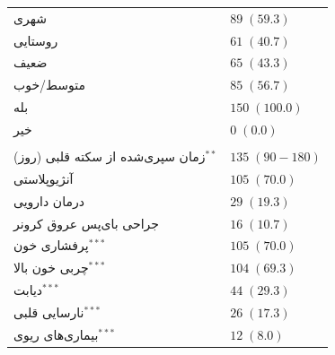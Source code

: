 {\begin{xltabular}{\textwidth}{@{} >{\raggedright\arraybackslash}X >{\centering\arraybackslash}X @{}}

        شهری   & $89 \; (59.3)$ \\

        روستایی & $61 \; (40.7)$ \\


        ضعیف        & $65 \; (43.3)$ \\

        متوسط/خوب   & $85 \; (56.7)$ \\


        بله & $150 \; (100.0)$ \\

        خیر & $0 \; (0.0)$ \\

        \midrule




         \\

        \midrule

        زمان سپری‌شده از سکته قلبی (روز)$^{**}$ & $135 \; (90 - 180)$ \\


        آنژیوپلاستی              & $105 \; (70.0)$ \\

        درمان دارویی             & $29 \; (19.3)$ \\

        جراحی بای‌پس عروق کرونر & $16 \; (10.7)$ \\


        پرفشاری خون$^{***}$      & $105 \; (70.0)$ \\

        چربی خون بالا$^{***}$   & $104 \; (69.3)$ \\

        دیابت$^{***}$           & $44 \; (29.3)$ \\

        نارسایی قلبی$^{***}$    & $26 \; (17.3)$ \\

        بیماری‌های ریوی$^{***}$  & $12 \; (8.0)$ \\


\end{xltabular}}
